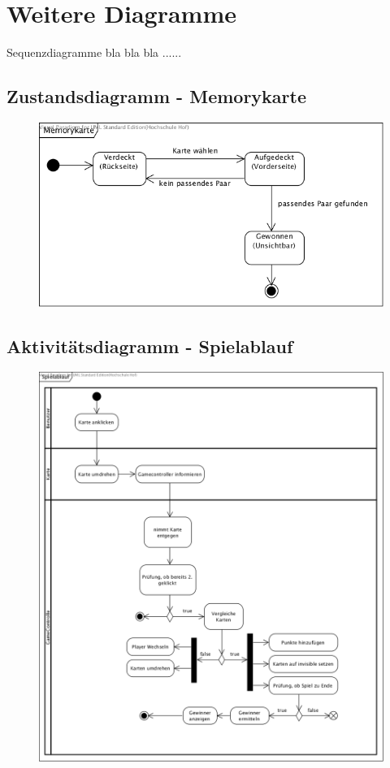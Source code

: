 \clearpage

\chapter{Weitere Diagramme}
Sequenzdiagramme bla bla bla ......


\clearpage
\section{Zustandsdiagramm - Memorykarte}

\begin{figure}[!h]
	\centering
    \includegraphics[width=\textwidth]{./ZD_Memorykarte.png}
	\label{layout_gesamt}
\end{figure}


\clearpage
\section{Aktivitätsdiagramm - Spielablauf}

\begin{figure}[!h]
	\centering
    \includegraphics[width=\textwidth]{./AD_Spielablauf.png}
	\label{layout_gesamt}
\end{figure}




